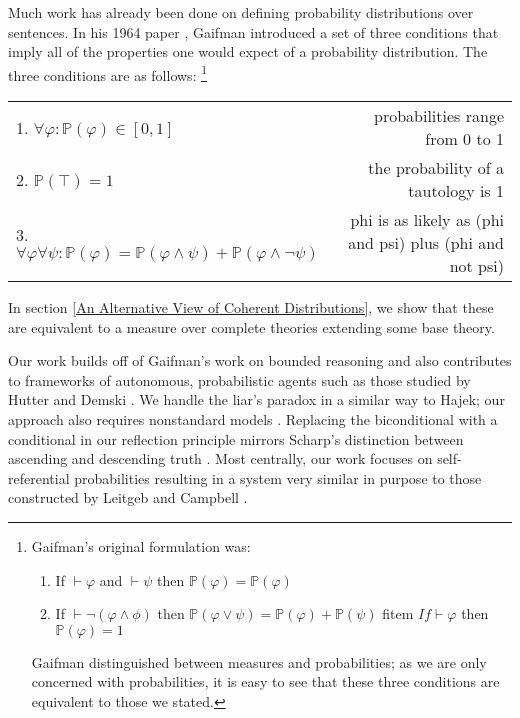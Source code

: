 \documentclass[12pt]{article}
\newcommand{\PP}{\mathbb{P}}
\newcommand{\vp}{\varphi}
\theoremstyle{plain}
\theoremstyle{definition}
\theoremstyle{remark}
\begin{document}
Much work has already been done on defining probability distributions over sentences. In his 1964 paper \cite{gaifman64}, Gaifman introduced a set of three conditions that imply all of the properties one would expect of a probability distribution. The three conditions are as follows:
\footnote{Gaifman's original formulation was:
\begin{enumerate}
\item If $\vdash \vp$ and $\vdash \psi$ then $\PP(\vp)=\PP(\vp)$
\item If $\vdash \neg (\vp \wedge \phi)$ then $\PP(\vp \vee \psi) = \PP(\vp) + \PP(\psi)$
fitem $If \vdash \vp$ then $\PP(\vp) = 1$
\end{enumerate}
Gaifman distinguished between measures and probabilities; as we are only concerned with probabilities, it is easy to see that these three conditions are equivalent to those we stated.
}
\begin{center}
\begin{tabular}{l r}
1. $\forall \vp: \PP(\vp) \in [0,1]$ & probabilities range from 0 to 1 \\
2. $\PP(\top) = 1$ & the probability of a tautology is 1 \\
3. $\forall \vp \forall \psi: \PP(\vp) = \PP(\vp \wedge \psi) + \PP(\vp \wedge \neg \psi)$ & phi is as likely as (phi and psi) plus (phi and not psi)
\end{tabular}
\end{center}

In section \ref{An Alternative View of Coherent Distributions}, we show that these are equivalent to a measure over complete theories extending some base theory.


% 


Our work builds off of Gaifman's work on bounded reasoning \cite{gaifman04} and also contributes 
to frameworks of autonomous, probabilistic agents such as those studied by Hutter and Demski
\cite{hutter13,demski12}.
We handle the liar's paradox in a similar way to Hajek; our approach also requires nonstandard models \cite{hajek98}.
Replacing the biconditional with a conditional in our reflection principle mirrors Scharp's distinction between ascending and descending truth \cite{scharp13}.
Most centrally, our work focuses on self-referential probabilities resulting in a system very similar in purpose to those constructed by Leitgeb and Campbell \cite{leitgeb08,leitgeb12a,leitgeb12b,campbell14}.
\end{document}
